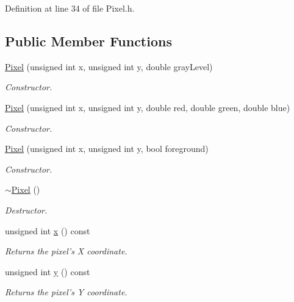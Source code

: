 Definition at line 34 of file Pixel.h.\subsection*{Public Member Functions}
\begin{CompactItemize}
\item 
\hyperlink{class_pixel_dfa33daefa83d3ac471af91fb32f8997}{Pixel} (unsigned int x, unsigned int y, double grayLevel)
\begin{CompactList}\small\item\em Constructor. \item\end{CompactList}\item 
\hyperlink{class_pixel_e5ca1376e87442aea5968a17a4240814}{Pixel} (unsigned int x, unsigned int y, double red, double green, double blue)
\begin{CompactList}\small\item\em Constructor. \item\end{CompactList}\item 
\hyperlink{class_pixel_fcbda001fcad04f4166129f9195a65fa}{Pixel} (unsigned int x, unsigned int y, bool foreground)
\begin{CompactList}\small\item\em Constructor. \item\end{CompactList}\item 
\hyperlink{class_pixel_30f6aaf9a1d8792245070860546fa365}{$\sim$Pixel} ()
\begin{CompactList}\small\item\em Destructor. \item\end{CompactList}\item 
unsigned int \hyperlink{class_pixel_68dafccc4588fb33d445641c2766316b}{x} () const 
\begin{CompactList}\small\item\em Returns the pixel's X coordinate. \item\end{CompactList}\item 
unsigned int \hyperlink{class_pixel_204cc91a99e1e4f1d96c9cf6caf5747a}{y} () const 
\begin{CompactList}\small\item\em Returns the pixel's Y coordinate. \item\end{CompactList}\item 

\end{CompactItemize}
